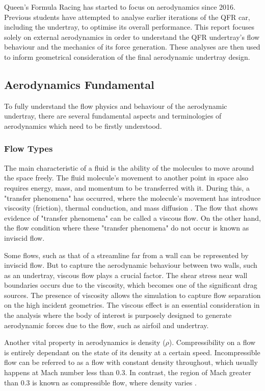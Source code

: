 \noindent Queen's Formula Racing has started to focus on aerodynamics since 2016. Previous students have attempted to analyse earlier iterations of the QFR car, including the undertray, to optimise its overall performance. This report focuses solely on external aerodynamics in order to understand the QFR undertray's flow behaviour and the mechanics of its force generation. These analyses are then used to inform geometrical consideration of the final aerodynamic undertray design.

\subsection{Aerodynamics Fundamental}
To fully understand the flow physics and behaviour of the aerodynamic undertray, there are several fundamental aspects and terminologies of aerodynamics which need to be firstly understood.

\subsubsection{Flow Types}
The main characteristic of a fluid is the ability of the molecules to move around the space freely. The fluid molecule's movement to another point in space also requires energy, mass, and momentum to be transferred with it. During this, a "transfer phenomena" has occurred, where the molecule's movement has introduce viscosity (friction), thermal conduction, and mass diffusion \cite{Anderson2010FundamentalsAerodynamics}. The flow that shows evidence of "transfer phenomena" can be called a viscous flow. On the other hand, the flow condition where these "transfer phenomena" do not occur is known as inviscid flow.

\noindent Some flows, such as that of a streamline far from a wall can be represented by inviscid flow. But to capture the aerodynamic behaviour between two walls, such as an undertray, viscous flow plays a crucial factor. The shear stress near wall boundaries occurs due to the viscosity, which becomes one of the significant drag sources. The presence of viscosity allows the simulation to capture flow separation on the high incident geometries. The viscous effect is an essential consideration in the analysis where the body of interest is purposely designed to generate aerodynamic forces due to the flow, such as airfoil and undertray.

\noindent Another vital property in aerodynamics is density ($\rho$). Compressibility on a flow is entirely dependant on the state of its density at a certain speed. Incompressible flow can be referred to as a flow with constant density throughout, which usually happens at Mach number less than 0.3. In contrast, the region of Mach greater than 0.3 is known as compressible flow, where density varies \cite{Anderson2010FundamentalsAerodynamics}.

